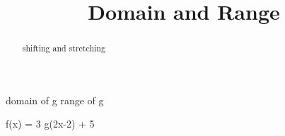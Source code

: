 \documentclass{ximera}
\title{Domain and Range}
\begin{document}
\begin{abstract}
shifting and stretching
\end{abstract}
\maketitle


domain of g
range of g

f(x) = 3 g(2x-2) + 5
\end{document}
